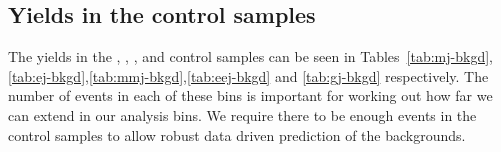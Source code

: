 \begin{table}[h]
\begin{tabular}
  \end{tabular}
\end{table}

\subsection{Yields in the control samples}

The yields in the \mj, \mmj, \ej, \eej and \gj control samples can be seen in
Tables~\ref{tab:mj-bkgd},\ref{tab:ej-bkgd},\ref{tab:mmj-bkgd},\ref{tab:eej-bkgd}
and \ref{tab:gj-bkgd} respectively. 
The number of events in each of these bins is important for
working out how far we can extend in our analysis bins. We require there to be
enough events in the control samples to allow robust data driven prediction of
the backgrounds.

